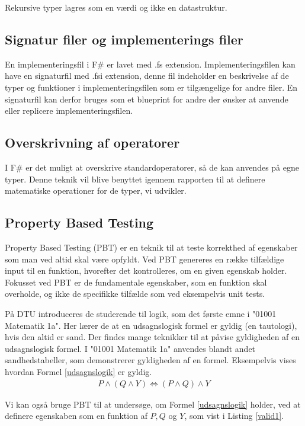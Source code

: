Rekursive typer lagres som en værdi og ikke en datastruktur.



\subsection{Signatur filer og implementerings filer}
En implementeringsfil i F\# er lavet med .fs extension. Implementeringsfilen kan have en signaturfil med .fsi extension, denne fil indeholder en beskrivelse af de typer og funktioner i implementeringsfilen som er tilgængelige for andre filer. En signaturfil kan derfor bruges som et blueprint for andre der ønsker at anvende eller replicere implementeringsfilen.

\subsection{Overskrivning af operatorer}
I F\# er det muligt at overskrive standardoperatorer, så de kan anvendes på egne typer. Denne teknik vil blive benyttet igennem rapporten til at definere matematiske operationer for de typer, vi udvikler.

\subsection{Property Based Testing}
Property Based Testing (PBT) er en teknik til at teste korrekthed af egenskaber som man ved altid skal være opfyldt. Ved PBT genereres en række tilfældige input til en funktion, hvorefter det kontrolleres, om en given egenskab holder. Fokusset ved PBT er de fundamentale egenskaber, som en funktion skal overholde, og ikke de specifikke tilfælde som ved eksempelvis unit tests.

På DTU introduceres de studerende til logik, som det første emne i "01001 Matematik 1a". Her lærer de at en udsagnslogisk formel er gyldig (en tautologi), hvis den altid er sand. Der findes mange teknikker til at påvise gyldigheden af en udsagnslogisk formel. I "01001 Matematik 1a" anvendes blandt andet sandhedstabeller, som demonstrerer gyldigheden af en formel. Eksempelvis vises hvordan Formel \eqref{udsagnslogik} er gyldig.
\begin{gather}
    P \land (Q \land Y) \iff (P \land Q) \land Y
    \label{udsagnslogik}
\end{gather}

Vi kan også bruge PBT til at undersøge, om Formel \eqref{udsagnslogik} holder, ved at definere egenskaben som en funktion af $P, Q$ og $Y$, som vist i Listing \ref{valid1}.

